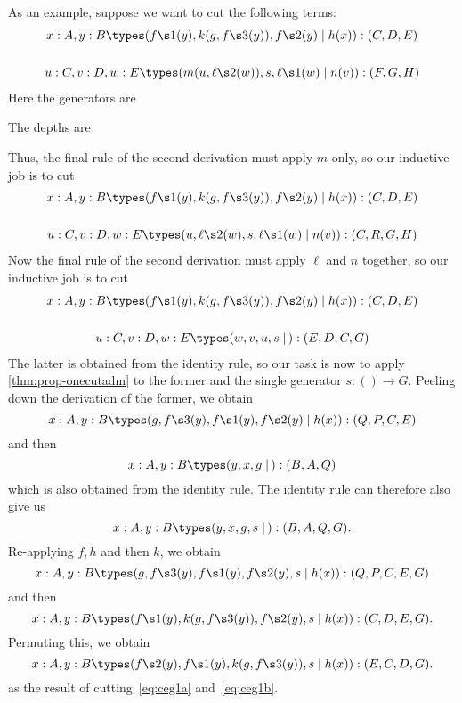 As an example, suppose we want to cut the following terms:
\begin{gather}
  x:A,y:B \types (f\s1(y),k(g,f\s3(y)),f\s2(y) \mid h(x)) : (C,D,E)\label{eq:ceg5a}
  \\\notag\\
  u:C,v:D,w:E \types (m(u,\ell\s2(w)),s,\ell\s1(w) \mid n(v)) : (F,G,H)\label{eq:ceg5b}
\end{gather}
Here the generators are
The depths are
Thus, the final rule of the second derivation must apply $m$ only, so our inductive job is to cut 
\begin{gather}
  x:A,y:B \types (f\s1(y),k(g,f\s3(y)),f\s2(y) \mid h(x)) : (C,D,E)\label{eq:ceg2a}
  \\\notag\\
  u:C,v:D,w:E \types (u,\ell\s2(w),s,\ell\s1(w) \mid n(v)) : (C,R,G,H)\label{eq:ceg2b}
\end{gather}
Now the final rule of the second derivation must apply $\ell$ and $n$ together, so our inductive job is to cut
\begin{gather}
  x:A,y:B \types (f\s1(y),k(g,f\s3(y)),f\s2(y) \mid h(x)) : (C,D,E)\label{eq:ceg1a}
  \\\notag\\
  u:C,v:D,w:E \types (w,v,u,s \mid\,) : (E,D,C,G)\label{eq:ceg1b}
\end{gather}
The latter is obtained from the identity rule, so our task is now to apply \cref{thm:prop-onecutadm} to the former and the single generator $s:()\to G$.
Peeling down the derivation of the former, we obtain
\[ x:A,y:B \types (g,f\s3(y),f\s1(y),f\s2(y) \mid h(x)) : (Q,P,C,E) \]
and then
\[ x:A,y:B \types (y,x,g \mid\,) : (B,A,Q) \]
which is also obtained from the identity rule.
The identity rule can therefore also give us
\[ x:A,y:B \types (y,x,g,s \mid\,) : (B,A,Q,G). \]
Re-applying $f,h$ and then $k$, we obtain
\[ x:A,y:B \types (g,f\s3(y),f\s1(y),f\s2(y),s \mid h(x)) : (Q,P,C,E,G) \]
and then
\[ x:A,y:B \types (f\s1(y),k(g,f\s3(y)),f\s2(y),s \mid h(x)) : (C,D,E,G). \]
Permuting this, we obtain
\[ x:A,y:B \types (f\s2(y),f\s1(y),k(g,f\s3(y)),s \mid h(x)) : (E,C,D,G). \]
as the result of cutting~\eqref{eq:ceg1a} and~\eqref{eq:ceg1b}.

